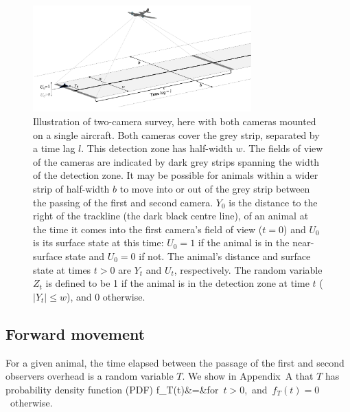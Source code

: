 \documentclass[useAMS, usenatbib, referee]{biom}\usepackage[]{graphicx}\usepackage[]{color}
\begin{document}
\begin{figure}
\includegraphics[width=0.75\textwidth]{twocams.png}
\centering
\caption{Illustration of two-camera survey, here with both cameras mounted on a single aircraft. Both cameras cover the grey strip, separated by a time lag $l$. This detection zone has half-width $w$. The fields of view of the cameras are indicated by dark grey strips spanning the width of the detection zone. It may be possible for animals within a wider strip of half-width $b$ to move into or out of the grey strip between the passing of the first and second camera. $Y_0$ is the distance to the right of the trackline (the dark black centre line), of an animal at the time it comes into the first camera's field of view ($t=0$) and $U_0$ is its surface state at this time: $U_0=1$ if the animal is in the near-surface state and $U_0=0$ if not. The animal's distance and surface state at times $t>0$ are $Y_t$ and $U_t$, respectively. The random variable $Z_t$ is defined to be 1 if the animal is in the detection zone at time $t$ ($|Y_t|\leq w$), and 0 otherwise.}
\label{fig:branching_updated}
\end{figure}


\subsection{Forward movement}

For a given animal, the time elapsed between the passage of the first and second observers overhead is a random variable $T$. We show in Appendix~A that $T$ has probability density function (PDF)
\be
f_{T}(t)&=&\;\;\mbox{for $t>0$, and $f_{T}(t)=0$ otherwise.}
\label{eq:fTt}
\ee
\noindent
\end{document}
